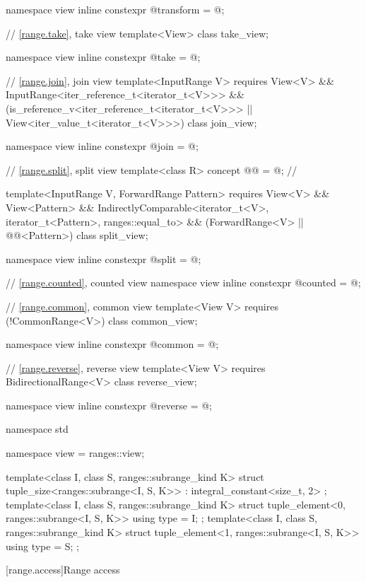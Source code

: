 \begin{codeblock}
{  namespace view { inline constexpr @\unspec@ transform = @\unspec@; }

  // \ref{range.take}, take view
  template<View> class take_view;

  namespace view { inline constexpr @\unspec@ take = @\unspec@; }

  // \ref{range.join}, join view
  template<InputRange V>
    requires View<V> && InputRange<iter_reference_t<iterator_t<V>>> &&
             (is_reference_v<iter_reference_t<iterator_t<V>>> ||
              View<iter_value_t<iterator_t<V>>>)
  class join_view;

  namespace view { inline constexpr @\unspec@ join = @\unspec@; }

  // \ref{range.split}, split view
  template<class R>
    concept @@ = @\seebelow@;   // \expos

  template<InputRange V, ForwardRange Pattern>
    requires View<V> && View<Pattern> &&
             IndirectlyComparable<iterator_t<V>, iterator_t<Pattern>, ranges::equal_to> &&
             (ForwardRange<V> || @@<Pattern>)
  class split_view;

  namespace view { inline constexpr @\unspec@ split = @\unspec@; }

  // \ref{range.counted}, counted view
  namespace view { inline constexpr @\unspec@ counted = @\unspec@; }

  // \ref{range.common}, common view
  template<View V>
    requires (!CommonRange<V>)
  class common_view;

  namespace view { inline constexpr @\unspec@ common = @\unspec@; }

  // \ref{range.reverse}, reverse view
  template<View V>
    requires BidirectionalRange<V>
  class reverse_view;

  namespace view { inline constexpr @\unspec@ reverse = @\unspec@; }
}

namespace std {
  namespace view = ranges::view;

  template<class I, class S, ranges::subrange_kind K>
  struct tuple_size<ranges::subrange<I, S, K>>
    : integral_constant<size_t, 2> {};
  template<class I, class S, ranges::subrange_kind K>
  struct tuple_element<0, ranges::subrange<I, S, K>> {
    using type = I;
  };
  template<class I, class S, ranges::subrange_kind K>
  struct tuple_element<1, ranges::subrange<I, S, K>> {
    using type = S;
  };
}
\end{codeblock}

[range.access]{Range access}

